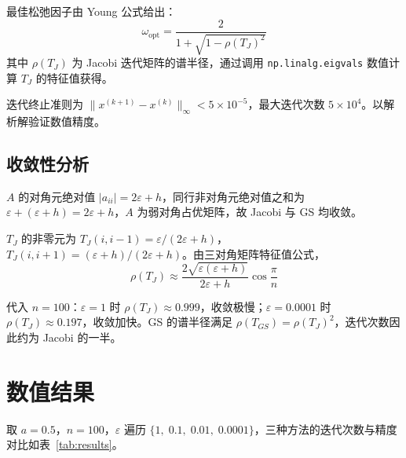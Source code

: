 \documentclass[10pt, a4paper]{article}
\begin{document}
最佳松弛因子由 Young 公式给出：
\[
\omega_{\text{opt}} = \frac{2}{1 + \sqrt{1 - \rho(T_J)^2}}
\]
其中 $\rho(T_J)$ 为 Jacobi 迭代矩阵的谱半径，通过调用 \texttt{np.linalg.eigvals} 数值计算 $T_J$ 的特征值获得。

迭代终止准则为 $\|x^{(k+1)}-x^{(k)}\|_\infty < 5\times10^{-5}$，最大迭代次数 $5\times10^4$。以解析解验证数值精度。

\subsection{收敛性分析}

$A$ 的对角元绝对值 $|a_{ii}| = 2\varepsilon + h$，同行非对角元绝对值之和为 $\varepsilon + (\varepsilon+h) = 2\varepsilon + h$，$A$ 为弱对角占优矩阵，故 Jacobi 与 GS 均收敛。

$T_J$ 的非零元为 $T_J(i,i-1) = \varepsilon/(2\varepsilon+h)$，$T_J(i,i+1) = (\varepsilon+h)/(2\varepsilon+h)$。由三对角矩阵特征值公式，
\[
\rho(T_J) \approx \frac{2\sqrt{\varepsilon(\varepsilon+h)}}{2\varepsilon+h}\cos\frac{\pi}{n}
\]

代入 $n=100$：$\varepsilon=1$ 时 $\rho(T_J) \approx 0.999$，收敛极慢；$\varepsilon=0.0001$ 时 $\rho(T_J) \approx 0.197$，收敛加快。GS 的谱半径满足 $\rho(T_{GS}) = \rho(T_J)^2$，迭代次数因此约为 Jacobi 的一半。

\section{数值结果}

取 $a=0.5$，$n=100$，$\varepsilon$ 遍历 $\{1,\;0.1,\;0.01,\;0.0001\}$，三种方法的迭代次数与精度对比如表~\ref{tab:results}。
\end{document}

